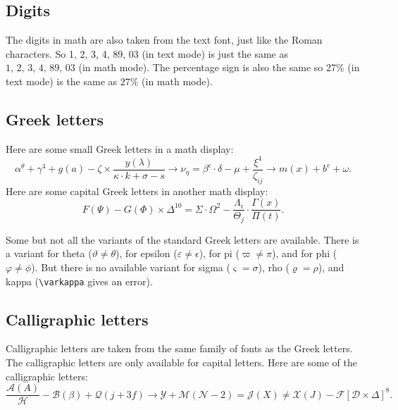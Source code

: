 \documentclass[letterpaper,11pt,leqno]{article}
\begin{document}
\subsection{Digits}

The digits in math are also taken from the text font, just like the Roman characters. So 1, 2, 3, 4, 89, 03 (in text mode) is just the same as $1,\,2,\,3,\,4,\,89,\,03$ (in math mode). The percentage sign is also the same so 27\% (in text mode) is the same as $27\%$ (in math mode).

\subsection{Greek letters}

Here are some small Greek letters in a math display: 
\begin{equation*}
\alpha^{\theta} + \gamma^4 + g(a) - \zeta \times \frac{y(\lambda)}{\kappa \cdot k+ \sigma - s} \to \nu_{\eta} = \beta^\epsilon \cdot \delta - \mu + \frac{\xi^4}{\zeta_{ij}} \to m(x) + b^e + \omega .
\end{equation*}
Here are some capital Greek letters in another math display: 
\begin{equation}
F(\Psi) - G(\Phi) \times \Delta^{10} = \Sigma \cdot \Omega^2 - \frac{\Lambda_i}{\Theta_j} \cdot \frac{\Gamma(x)}{\Pi(t)}.
\label{e:capitalgreek}\end{equation}

Some but not all the variants of the standard Greek letters are available. There is a variant for theta ($\vartheta \neq \theta$), for epsilon ($\varepsilon \neq \epsilon$), for pi ($\varpi \neq \pi$), and for phi ($\varphi \neq \phi$). But there is no available variant for sigma ($\varsigma = \sigma$), rho ($\varrho = \rho$), and kappa (\texttt{\textbackslash varkappa} gives an error).

\subsection{Calligraphic letters} 

Calligraphic letters are taken from the same family of fonts as the Greek letters. The calligraphic letters are only available for capital letters. Here are some of the calligraphic letters: 
\begin{equation*}
\frac{\mathcal{A}(A)}{\mathcal{H}} - \mathcal{B}(\beta) + \mathcal{Q}(j+3f) \to \mathcal{Y} + \mathcal{M}(\mathcal{N} - 2) = \mathcal{J}(X) \neq \mathcal{X}(J) - \mathcal{F}[\mathcal{D} \times \Delta]^8. 
\end{equation*}
\end{document}
